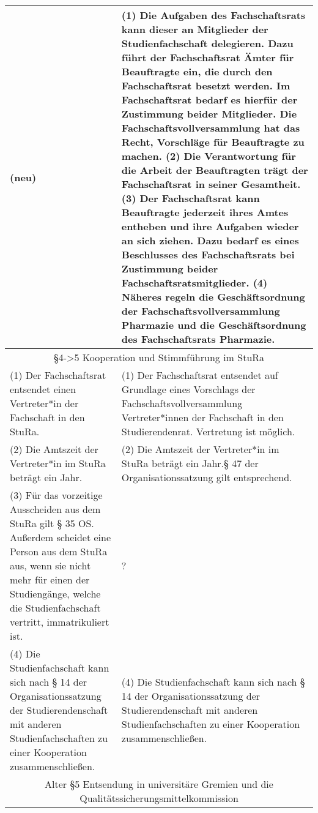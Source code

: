 {\begin{longtable}{|p{7.5cm}|p{7.5cm}|}
        (neu) &
        (1) Die Aufgaben des Fachschaftsrats kann dieser an Mitglieder der Studienfachschaft delegieren.
        Dazu führt der Fachschaftsrat Ämter für Beauftragte ein, die durch den Fachschaftsrat besetzt werden.
        Im Fachschaftsrat bedarf es hierfür der Zustimmung beider  Mitglieder.
        Die Fachschaftsvollversammlung hat das Recht, Vorschläge für Beauftragte zu machen.\newline
        (2) Die Verantwortung für die Arbeit der Beauftragten trägt der Fachschaftsrat in seiner Gesamtheit.\newline
        (3) Der Fachschaftsrat kann Beauftragte jederzeit ihres Amtes entheben und ihre Aufgaben wieder an sich ziehen.
        Dazu bedarf es eines Beschlusses des Fachschaftsrats bei Zustimmung beider Fachschaftsratsmitglieder.\newline
        (4) Näheres regeln die Geschäftsordnung der Fachschaftsvollversammlung Pharmazie und die Geschäftsordnung des
        Fachschaftsrats Pharmazie.\\\hline
        \multicolumn{2}{|c|}{§4->5 Kooperation und Stimmführung im StuRa}\\\hline
        (1) Der Fachschaftsrat entsendet einen Vertreter*in der Fachschaft in den StuRa.&
        (1) Der Fachschaftsrat entsendet auf Grundlage eines Vorschlags der Fachschaftsvollversammlung
        Vertreter*innen der Fachschaft in den Studierendenrat. Vertretung ist möglich.\\
        (2) Die Amtszeit der Vertreter*in im StuRa beträgt ein Jahr.&
        (2) Die Amtszeit der Vertreter*in im StuRa beträgt ein Jahr.§ 47 der Organisationssatzung gilt entsprechend.\\
        (3) Für das vorzeitige Ausscheiden aus dem StuRa gilt § 35 OS. Außerdem scheidet eine Person aus dem StuRa aus,
        wenn sie nicht mehr für einen der Studiengänge, welche die Studienfachschaft vertritt, immatrikuliert ist.&
        ?\\
        (4) Die Studienfachschaft kann sich nach § 14 der Organisationssatzung der Studierendenschaft mit anderen
        Studienfachschaften zu einer Kooperation zusammenschließen.&
        (4) Die Studienfachschaft kann sich nach § 14 der Organisationssatzung der Studierendenschaft
        mit anderen Studienfachschaften zu einer Kooperation zusammenschließen.\\
        \hline
        \multicolumn{2}{|c|}{Alter §5 Entsendung in universitäre Gremien und die Qualitätssicherungsmittelkommission}\\\hline

\end{longtable}}
